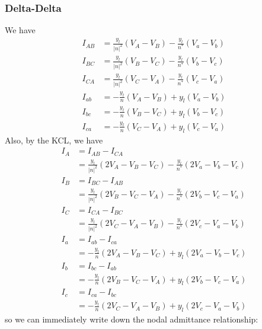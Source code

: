 \documentclass[10pt]{article}
\begin{document}
\subsubsection{Delta-Delta}
We have
\begin{align}
I_{AB} &= \frac{y_l}{|n|^2}(V_A - V_B) - \frac{y_l}{n^*}(V_a - V_b) \\
I_{BC} &= \frac{y_l}{|n|^2}(V_B - V_C) - \frac{y_l}{n^*}(V_b - V_c) \\
I_{CA} &= \frac{y_l}{|n|^2}(V_C - V_A) - \frac{y_l}{n^*}(V_c - V_a) \\
I_{ab} &= -\frac{y_l}{n}(V_A - V_B) + y_l (V_a - V_b) \\
I_{bc} &= -\frac{y_l}{n}(V_B - V_C) + y_l (V_b - V_c) \\
I_{ca} &= -\frac{y_l}{n}(V_C - V_A) + y_l (V_c - V_a)
\end{align}
Also, by the KCL, we have
\begin{align}
I_A &= I_{AB} - I_{CA} \\ &= \frac{y_l}{|n|^2}(2V_A - V_B - V_C) - \frac{y_l}{n^*}(2V_a - V_b - V_c) \\
I_B &= I_{BC} - I_{AB} \\ &= \frac{y_l}{|n|^2}(2V_B - V_C - V_A) - \frac{y_l}{n^*}(2V_b - V_c - V_a) \\
I_C &= I_{CA} - I_{BC} \\ &= \frac{y_l}{|n|^2}(2V_C - V_A - V_B) - \frac{y_l}{n^*}(2V_c - V_a - V_b) \\
I_a &= I_{ab} - I_{ca} \\ &= -\frac{y_l}{n}(2V_A - V_B - V_C) + y_l(2V_a - V_b - V_c) \\
I_b &= I_{bc} - I_{ab} \\ &= -\frac{y_l}{n}(2V_B - V_C - V_A) + y_l(2V_b - V_c - V_a) \\
I_c &= I_{ca} - I_{bc} \\ &= -\frac{y_l}{n}(2V_C - V_A - V_B) + y_l(2V_c - V_a - V_b)
\end{align}
so we can immediately write down the nodal admittance relationship:
\end{document}
